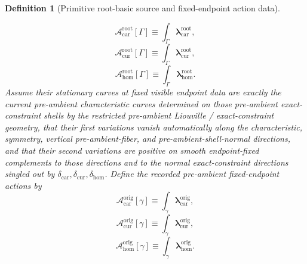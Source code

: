 \documentclass[11pt]{article}
\newcommand{\TensorConstraintGap}{\delta_{\mathrm{car}}}
\newcommand{\CurConstraintGap}{\delta_{\mathrm{cur}}}
\newcommand{\HomConstraintGap}{\delta_{\mathrm{hom}}}
\newcommand{\TensorOriginRateForm}{\boldsymbol{\lambda}_{\mathrm{car}}^{\mathrm{orig}}}
\newcommand{\CurOriginRateForm}{\boldsymbol{\lambda}_{\mathrm{cur}}^{\mathrm{orig}}}
\newcommand{\HomOriginRateForm}{\boldsymbol{\lambda}_{\mathrm{hom}}^{\mathrm{orig}}}
\newcommand{\TensorOriginAction}{\mathscr A_{\mathrm{car}}^{\mathrm{orig}}}
\newcommand{\CurOriginAction}{\mathscr A_{\mathrm{cur}}^{\mathrm{orig}}}
\newcommand{\HomOriginAction}{\mathscr A_{\mathrm{hom}}^{\mathrm{orig}}}
\newcommand{\TensorRootRateForm}{\boldsymbol{\lambda}_{\mathrm{car}}^{\mathrm{root}}}
\newcommand{\CurRootRateForm}{\boldsymbol{\lambda}_{\mathrm{cur}}^{\mathrm{root}}}
\newcommand{\HomRootRateForm}{\boldsymbol{\lambda}_{\mathrm{hom}}^{\mathrm{root}}}
\newcommand{\TensorRootAction}{\mathscr A_{\mathrm{car}}^{\mathrm{root}}}
\newcommand{\CurRootAction}{\mathscr A_{\mathrm{cur}}^{\mathrm{root}}}
\newcommand{\HomRootAction}{\mathscr A_{\mathrm{hom}}^{\mathrm{root}}}
\newtheorem{definition}{Definition}
\begin{document}
\begin{definition}[Primitive root-basic source and fixed-endpoint action data]
\begin{enumerate}
    \begin{equation}
    \TensorRootAction[\Gamma]\equiv\int_\Gamma \TensorRootRateForm,
    \label{eq:root_action_car}
    \end{equation}
    \begin{equation}
    \CurRootAction[\Gamma]\equiv\int_\Gamma \CurRootRateForm,
    \label{eq:root_action_cur}
    \end{equation}
    \begin{equation}
    \HomRootAction[\Gamma]\equiv\int_\Gamma \HomRootRateForm.
    \label{eq:root_action_hom}
    \end{equation}
    Assume their stationary curves at fixed visible endpoint data are exactly the current pre-ambient characteristic curves determined on those pre-ambient exact-constraint shells by the restricted pre-ambient Liouville / exact-constraint geometry, that their first variations vanish automatically along the characteristic, symmetry, vertical pre-ambient-fiber, and pre-ambient-shell-normal directions, and that their second variations are positive on smooth endpoint-fixed complements to those directions and to the normal exact-constraint directions singled out by \(\TensorConstraintGap,\CurConstraintGap,\HomConstraintGap\). Define the recorded pre-ambient fixed-endpoint actions by
    \begin{equation}
    \TensorOriginAction[\gamma]\equiv\int_\gamma \TensorOriginRateForm,
    \label{eq:origin_action_from_root_car}
    \end{equation}
    \begin{equation}
    \CurOriginAction[\gamma]\equiv\int_\gamma \CurOriginRateForm,
    \label{eq:origin_action_from_root_cur}
    \end{equation}
    \begin{equation}
    \HomOriginAction[\gamma]\equiv\int_\gamma \HomOriginRateForm.
    \label{eq:origin_action_from_root_hom}
    \end{equation}
\end{enumerate}
\end{definition}
\end{document}
